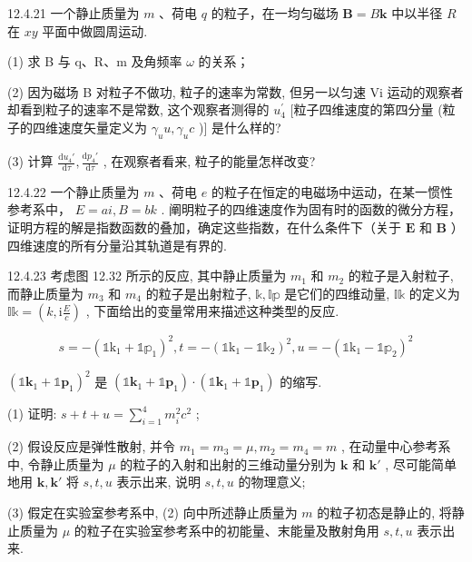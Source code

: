 \begin{problem}{12.4.21}
一个静止质量为 $m$ 、荷电 $q$ 的粒子，在一均匀磁场 $\bm{B} = B\bm{k}$ 中以半径 $R$ 在 $xy$ 平面中做圆周运动.

(1) 求 B 与 q、R、m 及角频率 $\omega$ 的关系；

(2) 因为磁场 B 对粒子不做功, 粒子的速率为常数, 但另一以匀速 Vi 运动的观察者却看到粒子的速率不是常数, 这个观察者测得的 $u_{4}^{\prime}$ [粒子四维速度的第四分量 (粒子的四维速度矢量定义为 $\gamma_{u}u, \gamma_{u}c$ )] 是什么样的?

(3) 计算 $\frac{\mathrm{d}u_4'}{\mathrm{d}\tau}, \frac{\mathrm{d}p_4'}{\mathrm{d}\tau}$ , 在观察者看来, 粒子的能量怎样改变?
\end{problem}
\clearpage


\begin{problem}{12.4.22}
一个静止质量为 $m$ 、荷电 $e$ 的粒子在恒定的电磁场中运动，在某一惯性参考系中， $E = ai, B = bk$ . 阐明粒子的四维速度作为固有时的函数的微分方程，证明方程的解是指数函数的叠加，确定这些指数，在什么条件下（关于 $\bm{E}$ 和 $\bm{B}$ ）四维速度的所有分量沿其轨道是有界的.
\end{problem}
\clearpage


\begin{problem}{12.4.23}
考虑图 12.32 所示的反应, 其中静止质量为 $m_{1}$ 和 $m_{2}$ 的粒子是入射粒子, 而静止质量为 $m_{3}$ 和 $m_{4}$ 的粒子是出射粒子, $\mathbb{k}, \mathbb{I}\mathbb{p}$ 是它们的四维动量, $\mathbb{I}\mathbb{k}$ 的定义为 $\mathbb{I}\mathbb{k} = \left(k, \mathrm{i}\frac{E}{c}\right)$ , 下面给出的变量常用来描述这种类型的反应.

\[
s = - \left(\mathbb {1} \mathrm{k} _ {1} + \mathbb {1 p} _ {1}\right) ^ {2}, t = - \left(\mathbb {1} \mathrm{k} _ {1} - \mathbb {1 k} _ {2}\right) ^ {2}, u = - \left(\mathbb {1} \mathrm{k} _ {1} - \mathbb {1 p} _ {2}\right) ^ {2}
\]

$(\mathbb{1}\mathbf{k}_1 + \mathbb{1}\mathbf{p}_1)^2$ 是 $(\mathbb{1}\mathbf{k}_1 + \mathbb{1}\mathbf{p}_1) \cdot (\mathbb{1}\mathbf{k}_1 + \mathbb{1}\mathbf{p}_1)$ 的缩写.

(1) 证明: $s + t + u = \sum_{i=1}^{4} m_i^2 c^2$ ;

(2) 假设反应是弹性散射, 并令 $m_{1} = m_{3} = \mu, m_{2} = m_{4} = m$ , 在动量中心参考系中, 令静止质量为 $\mu$ 的粒子的入射和出射的三维动量分别为 $\bm{k}$ 和 $\bm{k}'$ , 尽可能简单地用 $\bm{k}, \bm{k}'$ 将 $s, t, u$ 表示出来, 说明 $s, t, u$ 的物理意义;

(3) 假定在实验室参考系中, (2) 向中所述静止质量为 $m$ 的粒子初态是静止的, 将静止质量为 $\mu$ 的粒子在实验室参考系中的初能量、末能量及散射角用 $s, t, u$ 表示出来.
\begin{center}

\end{center}
\end{problem}
\clearpage

